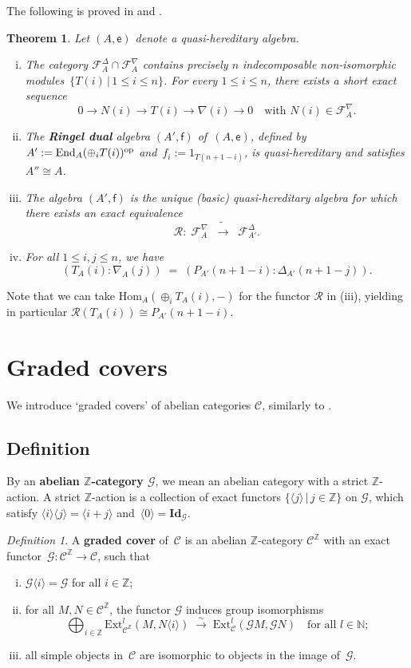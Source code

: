 \documentclass[11pt]{amsart}
\newcommand{\GG}{\mathscr{G}}
\newcommand{\RR}{\mathscr{R}}
\newcommand{\cF}{{\mathcal{F}}}
\newcommand{\Hom}{\mathrm{Hom}}
\newcommand{\Ext}{\mathrm{Ext}}
\newcommand{\End}{\mathrm{End}}
\newcommand{\op}{{\rm op}}
\newcommand{\cC}{\mathcal{C}}
\newcommand{\cG}{\mathcal{G}}
\newcommand{\mN}{\mathbb{N}}
\newcommand{\mZ}{\mathbb{Z}}
\numberwithin{equation}{section}
\theoremstyle{plain}
\newtheorem{thm}[subsubsection]{Theorem}
\theoremstyle{remark}
\newtheorem{ddef}[subsubsection]{Definition}
\theoremstyle{remark}
\theoremstyle{construction}
\begin{document}
The following is proved in \cite[Section~6]{Ringel} and \cite[Theorem~3]{DR}.
\begin{thm}\label{ThmRingelAlg}
Let $(A,\mathsf{e})$ denote a quasi-hereditary algebra. 
\begin{enumerate}[(i)]
\item The category $\cF_A^{\Delta}\cap\cF_A^{\nabla}$ contains precisely $n$ indecomposable non-isomorphic modules~$\{T(i)\,|\,1\le i\le n\}$. For every $1\le  i\le n$, there exists a short exact sequence
$$0\to N(i)\to T(i)\to \nabla(i)\to 0\quad\mbox{with $N(i)\in \cF^{\nabla}_A$.}$$
\item The {\bf Ringel dual} algebra $(A',\mathsf{f})$ of~$(A,\mathsf{e})$, defined by~$A':=\End_A(\oplus_i T(i))^{\op}$ and~$f_i:=1_{T(n+1-i)}$, is quasi-hereditary and satisfies $A''\cong A$.
\item The algebra $(A',\mathsf{f})$ is the unique (basic) quasi-hereditary algebra for which there exists an exact equivalence
$$\RR:\; \cF_A^{\nabla}\;\;\tilde{\to}\;\; \cF_{A'}^{\Delta}.$$
\item For all $1\le i,j\le n$, we have
$$(T_A(i):\nabla_A(j))\;=\;(P_{A'}(n+1-i):\Delta_{A'}(n+1-j)).$$
\end{enumerate}
\end{thm}

Note that we can take $\Hom_A(\oplus_i T_A(i),-)$ for the functor $\RR$ in (iii), yielding in particular $\RR(T_A(i))\cong P_{A'}(n+1-i)$.



\section{Graded covers}
We introduce `graded covers' of abelian categories $\cC$, similarly to \cite[Section~4.3]{BGS}.


\subsection{Definition}
By an {\bf abelian $\mZ$-category $\cG$}, we mean an abelian category with a strict $\mZ$-action. A strict $\mZ$-action is a collection of exact functors $\{\langle j\rangle\,|\, j\in\mZ\}$ on $\cG$, which satisfy $\langle i\rangle\langle j\rangle=\langle i+j\rangle$ and~$\langle0\rangle={\mathbf I}{\mathbf d}_{\cG}$.

\begin{ddef}\label{DefCover}
A {\bf graded cover} of~$\cC$ is an abelian $\mZ$-category $\cC^{\mZ}$ with an exact functor~$\GG:\cC^{\mZ}\to\cC$, such that 
\begin{enumerate}[(i)]
\item $\GG\langle i\rangle=\GG$ for all $i\in\mZ$;
\item for all $M,N\in \cC^{\mZ}$, the functor $\GG$ induces group isomorphisms 
$$\bigoplus_{i\in\mZ}\Ext^l_{\cC^{\mZ}}(M,N\langle i\rangle)\;\stackrel{\sim}{\to}\;\Ext^l_{\cC}(\GG M,\GG N)\quad\mbox{for all $l\in\mN$;}$$
\item all simple objects in~$\cC$ are isomorphic to objects in the image of~$\GG$.
\end{enumerate}
\end{ddef}
\end{document}
